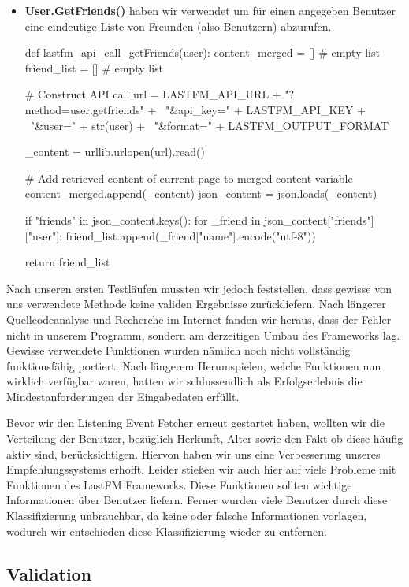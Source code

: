 \documentclass[prodmode,acmtecs]{acmsmall} %
\begin{document}
\begin{itemize}
\item \textbf{User.GetFriends()} haben wir verwendet um für einen angegeben Benutzer eine eindeutige Liste von Freunden (also Benutzern) abzurufen.
\begin{python}
def lastfm_api_call_getFriends(user):
    content_merged = []         # empty list
    friend_list = []            # empty list

    # Construct API call
    url = LASTFM_API_URL + "?method=user.getfriends" + \
        "&api_key=" + LASTFM_API_KEY + \
        "&user=" + str(user) + \
        "&format=" + LASTFM_OUTPUT_FORMAT

    _content = urllib.urlopen(url).read()

    # Add retrieved content of current page to merged content variable
    content_merged.append(_content)
    json_content = json.loads(_content)

    if "friends" in json_content.keys():
        for _friend in json_content["friends"]["user"]:
            friend_list.append(_friend["name"].encode("utf-8"))

    return friend_list
\end{python}
\end{itemize}

Nach unseren ersten Testläufen mussten wir jedoch feststellen, dass gewisse von uns verwendete Methode keine validen Ergebnisse zurückliefern. Nach längerer Quellcodeanalyse und Recherche im Internet fanden wir heraus, dass der Fehler nicht in unserem Programm, sondern am derzeitigen Umbau des Frameworks lag. Gewisse verwendete Funktionen wurden nämlich noch nicht vollständig funktionsfähig portiert. Nach längerem Herumspielen, welche Funktionen nun wirklich verfügbar waren, hatten wir schlussendlich als Erfolgserlebnis die Mindestanforderungen der Eingabedaten erfüllt.

Bevor wir den Listening Event Fetcher erneut gestartet haben, wollten wir die Verteilung der Benutzer, bezüglich Herkunft, Alter sowie den Fakt ob diese häufig aktiv sind, berücksichtigen. Hiervon haben wir uns eine Verbesserung unseres Empfehlungssystems erhofft. Leider stießen wir auch hier auf viele Probleme mit Funktionen des LastFM Frameworks. Diese Funktionen sollten wichtige Informationen über Benutzer liefern. Ferner wurden viele Benutzer durch diese Klassifizierung unbrauchbar, da keine oder falsche Informationen vorlagen, wodurch wir entschieden diese Klassifizierung wieder zu entfernen.

\subsection{Validation}
\end{document}
